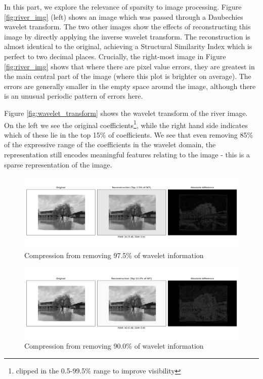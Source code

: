 \documentclass[12pt]{article}
\begin{document}
In this part, we explore the relevance of sparsity to image processing.
Figure \ref{fig:river_img} (left) shows an image which was passed through a Daubechies wavelet transform.
The two other images show the effects of reconstructing this image by directly applying the inverse wavelet transform.
The reconstruction is almost identical to the original, achieving a Structural Similarity Index which is perfect to two decimal places.
Crucially, the right-most image in Figure \ref{fig:river_img} shows that where there are pixel value errors,
they are greatest in the main central part of the image (where this plot is brighter on average).
The errors are generally smaller in the empty space around the image, although there is an unusual periodic pattern of errors here.

Figure \ref{fig:wavelet_transform} shows the wavelet transform of the river image.
On the left we see the original coefficients\footnote{clipped in the 0.5-99.5\% range to improve visibility},
while the right hand side indicates which of these lie in the top 15\% of coefficients.
We see that even removing 85\% of the expressive range of the coefficients in the wavelet domain,
the representation still encodes meaningful features relating to the image - this is a sparse representation of the image.

\begin{figure}[htp]
    \includegraphics[scale=0.35]{figures/river_img_compressed_0.025.png}
    \caption{Compression from removing 97.5\% of wavelet information}
    \label{fig:river_3pct}
\end{figure}

\begin{figure}[htp]
    \includegraphics[scale=0.35]{figures/river_img_compressed_0.100.png}
    \caption{Compression from removing 90.0\% of wavelet information}
    \label{fig:river_10pct}
\end{figure}
\end{document}
